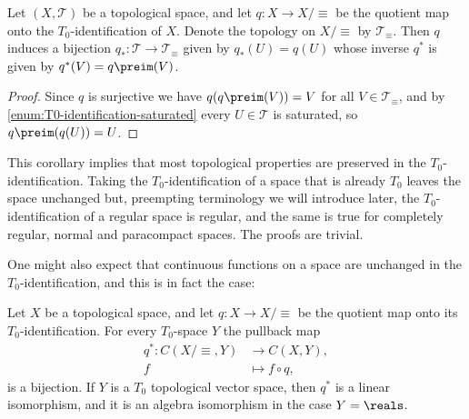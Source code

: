 \documentclass[article, a4paper, 11pt, oneside]{memoir}
\numberwithin{equation}{chapter}
\newcommand{\calT}{\mathcal{T}}
\begin{document}
\begin{corollary}
    Let $(X,\calT)$ be a topological space, and let $q \colon X \to X/{\equiv}$ be the quotient map onto the $T_0$-identification of $X$. Denote the topology on $X/{\equiv}$ by $\calT_\equiv$. Then $q$ induces a bijection $q_* \colon \calT \to \calT_\equiv$ given by $q_*(U) = q(U)$ whose inverse $q^*$ is given by $q^*(V) = q\preim(V)$.
\end{corollary}

\begin{proof}
    Since $q$ is surjective we have $q(q\preim(V)) = V$ for all $V \in \calT_\equiv$, and by \cref{enum:T0-identification-saturated} every $U \in \calT$ is saturated, so $q\preim(q(U)) = U$.
\end{proof}
%
This corollary implies that most topological properties are preserved in the $T_0$-identification. Taking the $T_0$-identification of a space that is already $T_0$ leaves the space unchanged but, preempting terminology we will introduce later, the $T_0$-identification of a regular space is regular, and the same is true for completely regular, normal and paracompact spaces. The proofs are trivial.

One might also expect that continuous functions on a space are unchanged in the $T_0$-identification, and this is in fact the case:

\begin{proposition}
    \label{thm:T0-identification-continuous-functions}
    Let $X$ be a topological space, and let $q \colon X \to X/{\equiv}$ be the quotient map onto its $T_0$-identification. For every $T_0$-space $Y$ the pullback map
    \begin{align*}
        q^* \colon C(X/{\equiv},Y) &\to C(X,Y), \\
        f &\mapsto f \circ q,
    \end{align*}
    is a bijection. If $Y$ is a $T_0$ topological vector space\footnotemark, then $q^*$ is a linear isomorphism, and it is an algebra isomorphism in the case $Y = \reals$. %
\end{proposition}
\end{document}
